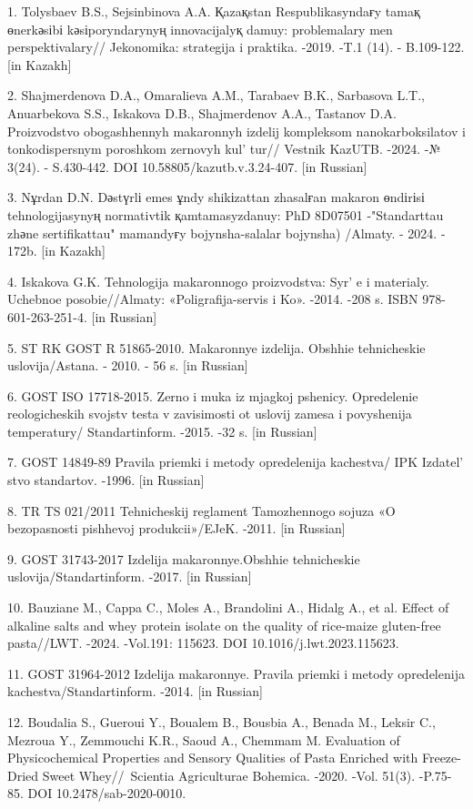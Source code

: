 \begin{refs}
1. Tolysbaev B.S., Sejsinbinova A.A. Қazaқstan Respublikasyndaғy tamaқ
өnerkәsіbі kәsіporyndarynyң innovacijalyқ damuy: problemalary men
perspektivalary// Jekonomika: strategija i praktika. -2019. -T.1 (14). -
B.109-122. {[}in Kazakh{]}

2. Shajmerdenova D.A., Omaralieva A.M., Tarabaev B.K., Sarbasova L.T.,
Anuarbekova S.S., Iskakova D.B., Shajmerdenov A.A., Tastanov D.A.
Proizvodstvo obogashhennyh makaronnyh izdelij kompleksom
nanokarboksilatov i tonkodispersnym poroshkom zernovyh
kul' tur// Vestnik KazUTB. -2024. -№ 3(24). - S.430-442.
DOI 10.58805/kazutb.v.3.24-407. {[}in Russian{]}

3. Nұrdan D.N. Dәstүrlі emes ұndy shikіzattan zhasalғan makaron өndіrіsі
tehnologijasynyң normativtіk қamtamasyzdanuy: PhD 8D07501 -"Standarttau
zhәne sertifikattau" mamandyғy bojynsha-salalar bojynsha) /Almaty. -
2024. - 172b. {[}in Kazakh{]}

4. Iskakova G.K. Tehnologija makaronnogo proizvodstva:
Syr' e i materialy. Uchebnoe posobie//Almaty:
«Poligrafija-servis i Ko». -2014. -208 s. ISBN 978-601-263-251-4. {[}in
Russian{]}

5. ST RK GOST R 51865-2010. Makaronnye izdelija. Obshhie tehnicheskie
uslovija/Astana. - 2010. - 56 s. {[}in Russian{]}

6. GOST ISO 17718-2015. Zerno i muka iz mjagkoj pshenicy. Opredelenie
reologicheskih svojstv testa v zavisimosti ot uslovij zamesa i
povyshenija temperatury/ Standartinform. -2015. -32 s. {[}in Russian{]}

7. GOST 14849-89 Pravila priemki i metody opredelenija kachestva/ IPK
Izdatel' stvo standartov. -1996. {[}in Russian{]}

8. TR TS 021/2011 Tehnicheskij reglament Tamozhennogo sojuza «O
bezopasnosti pishhevoj produkcii»/EJeK. -2011. {[}in Russian{]}

9. GOST 31743-2017 Izdelija makaronnye.Obshhie tehnicheskie
uslovija/Standartinform. -2017. {[}in Russian{]}

10. Bauziane M., Cappa C., Moles A., Brandolini A., Hidalg A., et al.
Effect of alkaline salts and whey protein isolate on the quality of
rice-maize gluten-free pasta//LWT. -2024. -Vol.191: 115623. DOI
10.1016/j.lwt.2023.115623.

11. GOST 31964-2012 Izdelija makaronnye. Pravila priemki i metody
opredelenija kachestva/Standartinform. -2014. {[}in Russian{]}

12. Boudalia S., Gueroui Y., Boualem B., Bousbia A., Benada M., Leksir
C., Mezroua Y., Zemmouchi K.R., Saoud A., Chemmam M. Evaluation of
Physicochemical Properties and Sensory Qualities of Pasta Enriched with
Freeze-Dried Sweet Whey//~Scientia Agriculturae Bohemica. -2020. -Vol.
51(3). -P.75- 85. DOI 10.2478/sab-2020-0010.


\end{refs}
